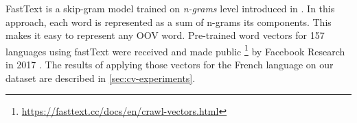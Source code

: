 FastText is a skip-gram model trained on \textit{n-grams} level introduced in \cite{Bojanowski-ACL2017}. In this approach, each word is represented as a sum of n-grams its components. This makes it easy to represent any OOV word. Pre-trained word vectors for 157 languages using fastText were received and made public \footnote{\url{https://fasttext.cc/docs/en/crawl-vectors.html}} by Facebook Research in 2017 \citep{Mikolov-2017}. The results of applying those vectors for the French language on our dataset are described in \ref{sec:cv-experiments}.

